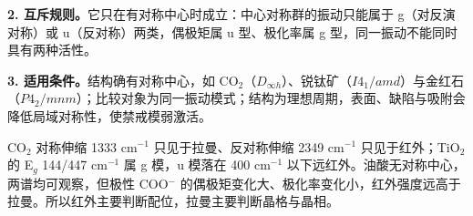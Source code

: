 \noindent\textbf{2. 互斥规则。}它只在有对称中心时成立：中心对称群的振动只能属于 g（对反演对称）或 u（反对称）两类，偶极矩属 u 型、极化率属 g 型，同一振动不能同时具有两种活性。

\noindent\textbf{3. 适用条件。}结构确有对称中心，如 CO$_2$（$D_{\infty h}$）、锐钛矿（$I4_1/amd$）与金红石（$P4_2/mnm$）；比较对象为同一振动模式；结构为理想周期，表面、缺陷与吸附会降低局域对称性，使禁戒模弱激活\cite{taudul2023}。

CO$_2$ 对称伸缩 1333 cm$^{-1}$ 只见于拉曼、反对称伸缩 2349 cm$^{-1}$ 只见于红外\cite{larkin2017}；TiO$_2$ 的 E$_g$ 144/447 cm$^{-1}$ 属 g 模，u 模落在 400 cm$^{-1}$ 以下远红外。油酸无对称中心，两谱均可观察，但极性 COO$^-$ 的偶极矩变化大、极化率变化小，红外强度远高于拉曼\cite{ning2014}。所以红外主要判断配位，拉曼主要判断晶格与晶相。
